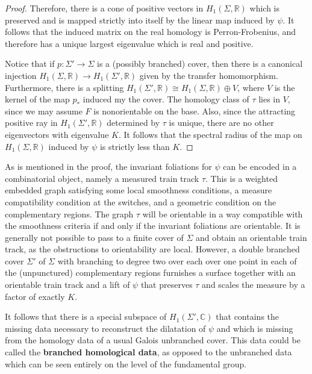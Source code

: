 \documentclass[11pt]{amsart}
\numberwithin{thm}{section}
\begin{document}
\begin{proof}
Therefore, there is a cone of positive vectors in $H_1(\Sigma,{\mathbb{R}})$ which is preserved and is mapped strictly into itself by the linear map induced by $\psi$.  It follows that the induced matrix on the real homology is Perron-Frobenius, and therefore has a unique largest eigenvalue which is real and positive.

Notice that if $p:\Sigma'\to\Sigma$ is a (possibly branched) cover, then there is a canonical injection $H_1(\Sigma,{\mathbb{R}})\to H_1(\Sigma',{\mathbb{R}})$ given by the transfer homomorphism.  Furthermore, there is a splitting $H_1(\Sigma',{\mathbb{R}})\cong H_1(\Sigma,{\mathbb{R}})\oplus V$, where $V$ is the kernel of the map $p_*$ induced my the cover.  The homology class of $\tau$ lies in $V$, since we may assume $F$ is nonorientable on the base.  Also, since the attracting positive ray in $H_1(\Sigma',{\mathbb{R}})$ determined by $\tau$ is unique, there are no other eigenvectors with eigenvalue $K$.  It follows that the spectral radius of the map on $H_1(\Sigma,{\mathbb{R}})$ induced by $\psi$ is strictly less than $K$.
\end{proof}

As is mentioned in the proof, the invariant foliations for $\psi$ can be encoded in a combinatorial object, namely a measured train track $\tau$.  This is a weighted embedded graph satisfying some local smoothness conditions, a measure compatibility condition at the switches, and a geometric condition on the complementary regions.  The graph $\tau$ will be orientable in a way compatible with the smoothness criteria if and only if the invariant foliations are orientable.  It is generally not possible to pass to a finite cover of $\Sigma$ and obtain an orientable train track, as the obstructions to orientability are local.  However, a double branched cover $\Sigma'$ of $\Sigma$ with branching to degree two over each over one point in each of the (unpunctured) complementary regions furnishes a surface together with an orientable train track and a lift of $\psi$ that preserves $\tau$ and scales the measure by a factor of exactly $K$.

It follows that there is a special subspace of $H_1(\Sigma',{\mathbb{C}})$ that contains the missing data necessary to reconstruct the dilatation of $\psi$ and which is missing from the homology data of a usual Galois unbranched cover.  This data could be called the {\bf branched homological data}, as opposed to the unbranched data which can be seen entirely on the level of the fundamental group.
\end{document}
